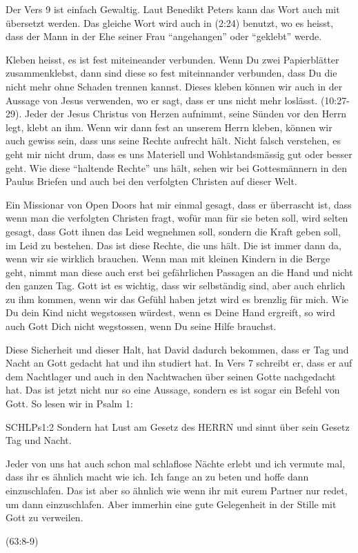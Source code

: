 \documentclass[14pt]{../../inc/mybib}
\begin{document}
    \begin{block}
        Der Vers 9 ist einfach Gewaltig. Laut Benedikt Peters kann das Wort  auch mit  übersetzt werden. Das gleiche Wort wird auch in (2:24) benutzt, wo es heisst, dass der Mann in der Ehe seiner Frau \enquote{angehangen} oder \enquote{geklebt} werde.

        Kleben heisst, es ist fest miteineander verbunden. Wenn Du zwei Papierblätter zusammenklebst, dann sind diese so fest miteinnander verbunden, dass Du die nicht mehr ohne Schaden trennen kannst. Dieses kleben können wir auch in der Aussage von Jesus verwenden, wo er sagt, dass er uns nicht mehr loslässt. (10:27-29). Jeder der Jesus Christus von Herzen aufnimmt, seine Sünden vor den Herrn legt, klebt an ihm. Wenn wir dann fest an unserem Herrn kleben, können wir auch gewiss sein, dass uns seine Rechte aufrecht hält. Nicht falsch verstehen, es geht mir nicht drum, dass es uns Materiell und Wohlstandsmässig gut oder besser geht. Wie diese \enquote{haltende Rechte} uns hält, sehen wir bei Gottesmännern in den Paulus Briefen und auch bei den verfolgten Christen auf dieser Welt. 
        
        Ein Missionar von Open Doors hat mir einmal gesagt, dass er überrascht ist, dass wenn man die verfolgten Christen fragt, wofür man für sie beten soll, wird selten gesagt, dass Gott ihnen das Leid wegnehmen soll, sondern die Kraft geben soll, im Leid zu bestehen. Das ist diese Rechte, die uns hält. Die ist immer dann da, wenn wir sie wirklich brauchen. Wenn man mit kleinen Kindern in die Berge geht, nimmt man diese auch erst bei gefährlichen Passagen an die Hand und nicht den ganzen Tag. Gott ist es wichtig, dass wir selbständig sind, aber auch ehrlich zu ihm kommen, wenn wir das Gefühl haben jetzt wird es brenzlig für mich. Wie Du dein Kind nicht wegstossen würdest, wenn es Deine Hand ergreift, so wird auch Gott Dich nicht wegstossen, wenn Du seine Hilfe brauchst.
    \end{block}
    \begin{block}
        Diese Sicherheit und dieser Halt, hat David dadurch bekommen, dass er Tag und Nacht an Gott gedacht hat und ihn studiert hat. In Vers 7 schreibt er, dass er auf dem Nachtlager und auch in den Nachtwachen über seinen Gotte nachgedacht hat. Das ist jetzt nicht nur so eine Aussage, sondern es ist sogar ein Befehl von Gott. So lesen wir in Psalm 1:
        \begin{bibelbox}{SCHL}{Ps}{1:2}
            Sondern hat Lust am Gesetz des HERRN und sinnt über sein Gesetz Tag und Nacht.
        \end{bibelbox}
        Jeder von uns hat auch schon mal schlaflose Nächte erlebt und ich vermute mal, dass ihr es ähnlich macht wie ich. Ich fange an zu beten und hoffe dann einzuschlafen. Das ist aber so ähnlich wie wenn ihr mit eurem Partner nur redet, um dann einzuschlafen. Aber immerhin eine gute Gelegenheit in der Stille mit Gott zu verweilen.
    \end{block}
    (63:8-9)
\end{document}
